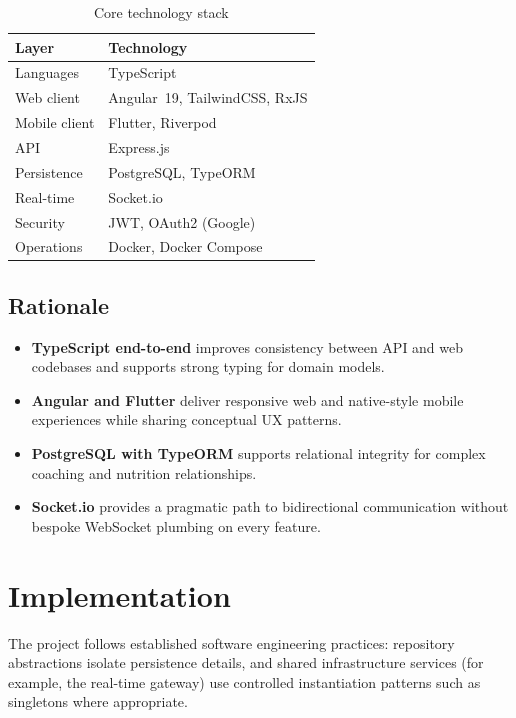 \documentclass[11pt,a4paper]{report}
\begin{document}
\begin{table}[htbp]
  \centering
  \caption{Core technology stack}
  \label{tab:tech}
  \begin{tabular}{@{}ll@{}}
    \toprule
    \textbf{Layer} & \textbf{Technology} \\
    \midrule
    Languages & TypeScript \\
    Web client & Angular~19, TailwindCSS, RxJS \\
    Mobile client & Flutter, Riverpod \\
    API & Express.js \\
    Persistence & PostgreSQL, TypeORM \\
    Real-time & Socket.io \\
    Security & JWT, OAuth2 (Google) \\
    Operations & Docker, Docker Compose \\
    \bottomrule
  \end{tabular}
\end{table}

\section{Rationale}
\begin{itemize}[leftmargin=*]
  \item \textbf{TypeScript end-to-end} improves consistency between API and web codebases and supports strong typing for domain models.
  \item \textbf{Angular and Flutter} deliver responsive web and native-style mobile experiences while sharing conceptual UX patterns.
  \item \textbf{PostgreSQL with TypeORM} supports relational integrity for complex coaching and nutrition relationships.
  \item \textbf{Socket.io} provides a pragmatic path to bidirectional communication without bespoke WebSocket plumbing on every feature.
\end{itemize}

\chapter{Implementation}

The project follows established software engineering practices: repository abstractions isolate persistence details, and shared infrastructure services (for example, the real-time gateway) use controlled instantiation patterns such as singletons where appropriate.
\end{document}
